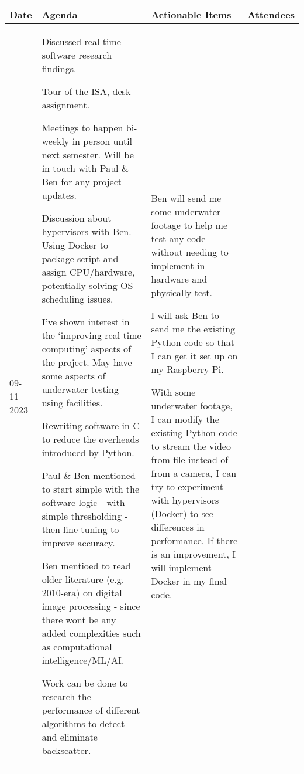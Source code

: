 \begin{table}[!h]
    \centering
    \begin{tabularx}{\textwidth}{|l|X|X|X|}
        \hline
        Date & Agenda & Actionable Items & Attendees \\
        \hline
        \hline
        09-11-2023 & 
        \begin{myitemize}
            \item Discussed real-time software research findings.
            \item Tour of the ISA, desk assignment.
            \item Meetings to happen bi-weekly in person until next semester. Will be in touch with Paul \& Ben for any project updates.
            \item Discussion about hypervisors with Ben. Using Docker to package script and assign CPU/hardware, potentially solving OS scheduling issues.
            \item I've shown interest in the `improving real-time computing' aspects of the project. May have some aspects of underwater testing using facilities.
            \item Rewriting software in C to reduce the overheads introduced by Python.
            \item Paul \& Ben mentioned to start simple with the software logic - with simple thresholding - then fine tuning to improve accuracy.
            \item Ben mentioed to read older literature (e.g. 2010-era) on digital image processing - since there wont be any added complexities such as computational intelligence/ML/AI.
            \item Work can be done to research the performance of different algorithms to detect and eliminate backscatter.
        \end{myitemize} & 
        \begin{myitemize}
            \item Ben will send me some underwater footage to help me test any code without needing to implement in hardware and physically test.
            \item I will ask Ben to send me the existing Python code so that I can get it set up on my Raspberry Pi.
            \item With some underwater footage, I can modify the existing Python code to stream the video from file instead of from a camera, I can try to experiment with hypervisors (Docker) to see differences in performance. If there is an improvement, I will implement Docker in my final code.

\end{myitemize}
\end{tabularx}
\end{table}
